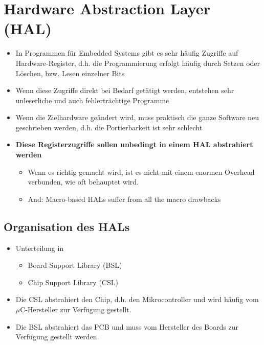 \section{Hardware Abstraction Layer (HAL)}
\begin{itemize}
  \item In Programmen für Embedded Systems gibt es sehr häufig Zugriffe auf Hardware-Register, d.h. die Programmierung erfolgt häufig durch Setzen oder Löschen, bzw. Lesen einzelner Bits
  \item Wenn diese Zugriffe direkt bei Bedarf getätigt werden, entstehen sehr unleserliche und auch fehlerträchtige Programme
  \item Wenn die Zielhardware geändert wird, muss praktisch die ganze Software neu geschrieben werden, d.h. die Portierbarkeit ist sehr schlecht
  \item \textbf{Diese Registerzugriffe sollen unbedingt in einem HAL abstrahiert werden}
  \begin{itemize}
    \item Wenn es richtig gemacht wird, ist es nicht mit einem enormen Overhead verbunden, wie oft behauptet wird.
    \item And: Macro-based HALs suffer from all the macro drawbacks
  \end{itemize}
\end{itemize}

\subsection{Organisation des HALs}
\begin{itemize}
  \item Unterteilung in
  \begin{itemize}
    \item Board Support Library (BSL)
    \item Chip Support Library (CSL)
  \end{itemize}
  \item Die CSL abstrahiert den Chip, d.h. den Mikrocontroller und wird häufig vom $\mu$C-Hersteller zur Verfügung gestellt.
  \item Die BSL abstrahiert das PCB und muss vom Hersteller des Boards zur Verfügung gestellt werden.
\end{itemize}

